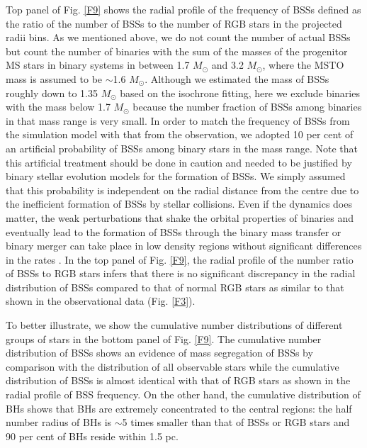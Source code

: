 \documentclass[useAMS,usenatbib,twocolumn]{mnras}
\begin{document}
Top panel of Fig. \ref{F9} shows the radial profile of the frequency of BSSs defined as the ratio of the number of BSSs to the number of RGB stars in the projected radii bins. As we mentioned above, we do not count the number of actual BSSs but count the number of binaries with the sum of the masses of the progenitor MS stars in binary systems in between 1.7 $M_{\odot}$ and 3.2 $M_{\odot}$, where the MSTO mass is assumed to be $\sim$1.6 $M_{\odot}$. 
Although we estimated the mass of BSSs roughly down to 1.35 $M_{\odot}$ based on the isochrone fitting, here we exclude binaries with the mass below 1.7 $M_{\odot}$ because the number fraction of BSSs among binaries in that mass range is very small. In order to match the frequency of BSSs from the simulation model with that from the observation, we adopted 10 per cent of an artificial probability of BSSs among binary stars in the mass range. Note that this artificial treatment should be done in caution and needed to be justified by binary stellar evolution models for the formation of BSSs. We simply assumed that this probability is independent on the radial distance from the centre due to the inefficient formation of BSSs by stellar collisions.
Even if the dynamics does matter, the weak perturbations that shake the orbital properties of binaries and eventually lead to the formation of BSSs through the binary mass transfer or binary merger can take place in low density regions without significant differences in the rates \citep[see also the Fig. 3 in ][]{2017MNRAS.464.2511H}. In the top panel of Fig. \ref{F9}, the radial profile of the number ratio of BSSs to RGB stars infers that there is no significant discrepancy in the radial distribution of BSSs compared to that of normal RGB stars as similar to that shown in the observational data (Fig. \ref{F3}).

To better illustrate, we show the cumulative number distributions of different groups of stars in the bottom panel of Fig. \ref{F9}. The cumulative number distribution of BSSs shows an evidence of mass segregation of BSSs by comparison with the distribution of all observable stars while
the cumulative distribution of BSSs is almost identical with that of RGB stars as shown in the radial profile of BSS frequency.
On the other hand, the cumulative distribution of BHs shows that BHs are extremely concentrated to the central regions: the half number radius of BHs is $\sim$5 times smaller than that of BSSs or RGB stars and 90 per cent of BHs reside within 1.5 pc.
\end{document}
